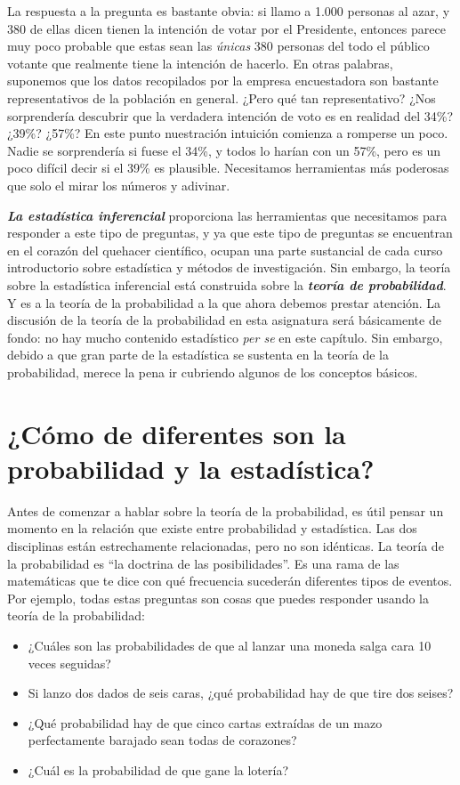 \documentclass[spanish,]{book}
\providecommand{\tightlist}{%
  \setlength{\itemsep}{0pt}\setlength{\parskip}{0pt}}
\begin{document}
La respuesta a la pregunta es bastante obvia: si llamo a 1.000 personas
al azar, y 380 de ellas dicen tienen la intención de votar por el
Presidente, entonces parece muy poco probable que estas sean las
\emph{únicas} 380 personas del todo el público votante que realmente
tiene la intención de hacerlo. En otras palabras, suponemos que los
datos recopilados por la empresa encuestadora son bastante
representativos de la población en general. ¿Pero qué tan
representativo? ¿Nos sorprendería descubrir que la verdadera intención
de voto es en realidad del 34\%? ¿39\%? ¿57\%? En este punto nuestración
intuición comienza a romperse un poco. Nadie se sorprendería si fuese el
34\%, y todos lo harían con un 57\%, pero es un poco difícil decir si el
39\% es plausible. Necesitamos herramientas más poderosas que solo el
mirar los números y adivinar.

\textbf{\emph{La estadística inferencial}} proporciona las herramientas
que necesitamos para responder a este tipo de preguntas, y ya que este
tipo de preguntas se encuentran en el corazón del quehacer científico,
ocupan una parte sustancial de cada curso introductorio sobre
estadística y métodos de investigación. Sin embargo, la teoría sobre la
estadística inferencial está construida sobre la \textbf{\emph{teoría de
probabilidad}}. Y es a la teoría de la probabilidad a la que ahora
debemos prestar atención. La discusión de la teoría de la probabilidad
en esta asignatura será básicamente de fondo: no hay mucho contenido
estadístico \emph{per se} en este capítulo. Sin embargo, debido a que
gran parte de la estadística se sustenta en la teoría de la
probabilidad, merece la pena ir cubriendo algunos de los conceptos
básicos.

\section{¿Cómo de diferentes son la probabilidad y la
estadística?}\label{probstats}

Antes de comenzar a hablar sobre la teoría de la probabilidad, es útil
pensar un momento en la relación que existe entre probabilidad y
estadística. Las dos disciplinas están estrechamente relacionadas, pero
no son idénticas. La teoría de la probabilidad es ``la doctrina de las
posibilidades''. Es una rama de las matemáticas que te dice con qué
frecuencia sucederán diferentes tipos de eventos. Por ejemplo, todas
estas preguntas son cosas que puedes responder usando la teoría de la
probabilidad:

\begin{itemize}
\tightlist
\item
  ¿Cuáles son las probabilidades de que al lanzar una moneda salga cara
  10 veces seguidas?
\item
  Si lanzo dos dados de seis caras, ¿qué probabilidad hay de que tire
  dos seises?
\item
  ¿Qué probabilidad hay de que cinco cartas extraídas de un mazo
  perfectamente barajado sean todas de corazones?
\item
  ¿Cuál es la probabilidad de que gane la lotería?
\end{itemize}
\end{document}
